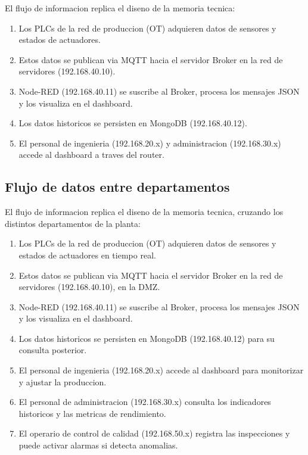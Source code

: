 El flujo de informacion replica el diseno de la memoria tecnica:

\begin{enumerate}
    \item Los PLCs de la red de produccion (OT) adquieren datos de sensores y estados de actuadores.
    \item Estos datos se publican via MQTT hacia el servidor Broker en la red de servidores (192.168.40.10).
    \item Node-RED (192.168.40.11) se suscribe al Broker, procesa los mensajes JSON y los visualiza en el dashboard.
    \item Los datos historicos se persisten en MongoDB (192.168.40.12).
    \item El personal de ingenieria (192.168.20.x) y administracion (192.168.30.x) accede al dashboard a traves del router.
\end{enumerate}

\subsection{Flujo de datos entre departamentos}

El flujo de informacion replica el diseno de la memoria tecnica, cruzando los distintos departamentos de la planta:

\begin{enumerate}
    \item Los PLCs de la red de produccion (OT) adquieren datos de sensores y estados de actuadores en tiempo real.
    \item Estos datos se publican via MQTT hacia el servidor Broker en la red de servidores (192.168.40.10), en la DMZ.
    \item Node-RED (192.168.40.11) se suscribe al Broker, procesa los mensajes JSON y los visualiza en el dashboard.
    \item Los datos historicos se persisten en MongoDB (192.168.40.12) para su consulta posterior.
    \item El personal de ingenieria (192.168.20.x) accede al dashboard para monitorizar y ajustar la produccion.
    \item El personal de administracion (192.168.30.x) consulta los indicadores historicos y las metricas de rendimiento.
    \item El operario de control de calidad (192.168.50.x) registra las inspecciones y puede activar alarmas si detecta anomalias.
\end{enumerate}

